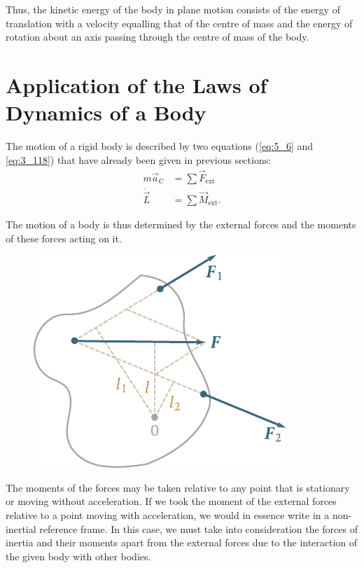 Thus, the kinetic energy of the body in plane motion consists of the energy of translation with a velocity equalling that of the centre of mass and the energy of rotation about an axis passing through the centre of mass of the body.

\section{Application of the Laws of Dynamics of a Body}\label{sec:5_8}

The motion of a rigid body is described by two equations (\eqref{eq:5_6} and \eqref{eq:3_118}) that have already been given in previous sections:
\begin{align*}
	m\vec{a}_{\text{C}} &= \sum\vec{F}_{\text{ext}}\\
	\dot{\vec{L}} &= \sum\vec{M}_{\text{ext}}.
\end{align*}

\noindent
The motion of a body is thus determined by the external forces and the moments of these forces acting on it.

\begin{figure}[t]
	\begin{center}
		\includegraphics[scale=0.95]{figures/ch_05/fig_5_20.pdf}
		\caption[]{}
		\label{fig:5_20}
	\end{center}
	\vspace{-1.0cm}
\end{figure}

The moments of the forces may be taken relative to any point that is stationary or moving without acceleration. If we took the moment of the external forces relative to a point moving with acceleration, we would in essence write  in a non-inertial reference frame. In this case, we must take into consideration the forces of inertia and their moments apart from the external forces due to the interaction of the given body with other bodies.

